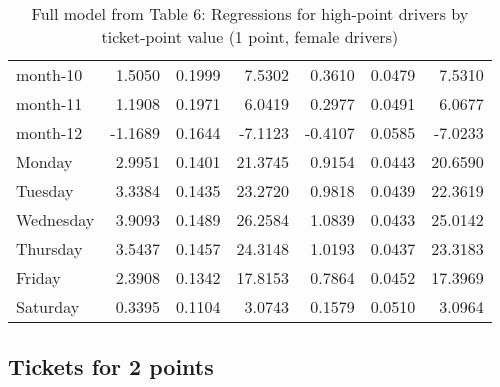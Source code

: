 \documentclass[10pt]{article}
\begin{document}
\begin{table}[ht]
\begin{tabular}{lrrrrrr}
  month-10 & 1.5050 & 0.1999 & 7.5302 & 0.3610 & 0.0479 & 7.5310 \\ 
  month-11 & 1.1908 & 0.1971 & 6.0419 & 0.2977 & 0.0491 & 6.0677 \\ 
  month-12 & -1.1689 & 0.1644 & -7.1123 & -0.4107 & 0.0585 & -7.0233 \\ 
  Monday & 2.9951 & 0.1401 & 21.3745 & 0.9154 & 0.0443 & 20.6590 \\ 
  Tuesday & 3.3384 & 0.1435 & 23.2720 & 0.9818 & 0.0439 & 22.3619 \\ 
  Wednesday & 3.9093 & 0.1489 & 26.2584 & 1.0839 & 0.0433 & 25.0142 \\ 
  Thursday & 3.5437 & 0.1457 & 24.3148 & 1.0193 & 0.0437 & 23.3183 \\ 
  Friday & 2.3908 & 0.1342 & 17.8153 & 0.7864 & 0.0452 & 17.3969 \\ 
  Saturday & 0.3395 & 0.1104 & 3.0743 & 0.1579 & 0.0510 & 3.0964 \\ 
   \hline
\end{tabular}
\caption{Full model from Table 6: Regressions for high-point drivers by ticket-point value (1 point, female drivers)} 
\label{tab_6_1_pts_no_age_F}
\end{table}


\clearpage
\pagebreak




\subsection{Tickets for 2 points}



\end{document}
